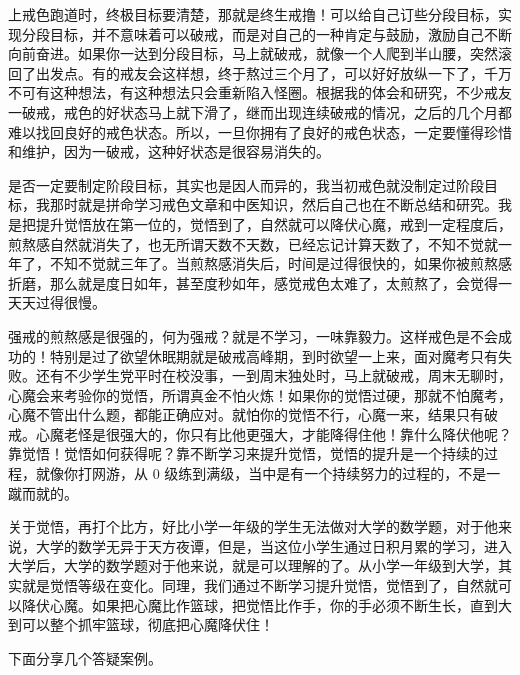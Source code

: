 上戒色跑道时，终极目标要清楚，那就是终生戒撸！可以给自己订些分段目标，实现分段目标，并不意味着可以破戒，而是对自己的一种肯定与鼓励，激励自己不断向前奋进。如果你一达到分段目标，马上就破戒，就像一个人爬到半山腰，突然滚回了出发点。有的戒友会这样想，终于熬过三个月了，可以好好放纵一下了，千万不可有这种想法，有这种想法只会重新陷入怪圈。根据我的体会和研究，不少戒友一破戒，戒色的好状态马上就下滑了，继而出现连续破戒的情况，之后的几个月都难以找回良好的戒色状态。所以，一旦你拥有了良好的戒色状态，一定要懂得珍惜和维护，因为一破戒，这种好状态是很容易消失的。

是否一定要制定阶段目标，其实也是因人而异的，我当初戒色就没制定过阶段目标，我那时就是拼命学习戒色文章和中医知识，然后自己也在不断总结和研究。我是把提升觉悟放在第一位的，觉悟到了，自然就可以降伏心魔，戒到一定程度后，煎熬感自然就消失了，也无所谓天数不天数，已经忘记计算天数了，不知不觉就一年了，不知不觉就三年了。当煎熬感消失后，时间是过得很快的，如果你被煎熬感折磨，那么就是度日如年，甚至度秒如年，感觉戒色太难了，太煎熬了，会觉得一天天过得很慢。

强戒的煎熬感是很强的，何为强戒？就是不学习，一味靠毅力。这样戒色是不会成功的！特别是过了欲望休眠期就是破戒高峰期，到时欲望一上来，面对魔考只有失败。还有不少学生党平时在校没事，一到周末独处时，马上就破戒，周末无聊时，心魔会来考验你的觉悟，所谓真金不怕火炼！如果你的觉悟过硬，那就不怕魔考，心魔不管出什么题，都能正确应对。就怕你的觉悟不行，心魔一来，结果只有破戒。心魔老怪是很强大的，你只有比他更强大，才能降得住他！靠什么降伏他呢？靠觉悟！觉悟如何获得呢？靠不断学习来提升觉悟，觉悟的提升是一个持续的过程，就像你打网游，从 0 级练到满级，当中是有一个持续努力的过程的，不是一蹴而就的。

关于觉悟，再打个比方，好比小学一年级的学生无法做对大学的数学题，对于他来说，大学的数学无异于天方夜谭，但是，当这位小学生通过日积月累的学习，进入大学后，大学的数学题对于他来说，就是可以理解的了。从小学一年级到大学，其实就是觉悟等级在变化。同理，我们通过不断学习提升觉悟，觉悟到了，自然就可以降伏心魔。如果把心魔比作篮球，把觉悟比作手，你的手必须不断生长，直到大到可以整个抓牢篮球，彻底把心魔降伏住！

下面分享几个答疑案例。


